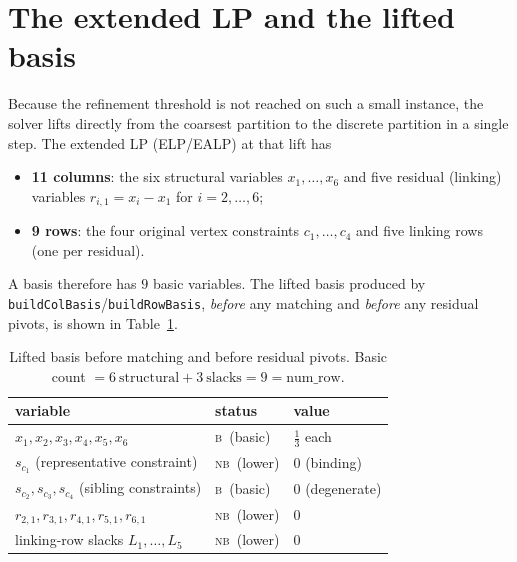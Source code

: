 \documentclass[11pt]{article}
\newcommand{\nb}{\textsc{nb}}
\newcommand{\bas}{\textsc{b}}
\newcommand{\slack}[1]{s_{#1}}
\begin{document}
\section{The extended LP and the lifted basis}

Because the refinement threshold is not reached on such a small instance, the
solver lifts directly from the coarsest partition to the discrete partition in a
single step. The extended LP (ELP/EALP) at that lift has
\begin{itemize}[nosep]
  \item \textbf{11 columns}: the six structural variables $x_1,\dots,x_6$ and
  five residual (linking) variables $r_{i,1}=x_i-x_1$ for $i=2,\dots,6$;
  \item \textbf{9 rows}: the four original vertex constraints $c_1,\dots,c_4$ and
  five linking rows (one per residual).
\end{itemize}
A basis therefore has $9$ basic variables. The lifted basis produced by
\texttt{buildColBasis}/\texttt{buildRowBasis}, \emph{before} any matching and
\emph{before} any residual pivots, is shown in Table~\ref{tab:lifted}.

\begin{table}[h]
\centering
\begin{tabular}{lll}
\toprule
variable & status & value\\
\midrule
$x_1,x_2,x_3,x_4,x_5,x_6$ & \bas\ (basic) & $\tfrac13$ each\\
$\slack{c_1}$ (representative constraint) & \nb\ (lower) & $0$ (binding)\\
$\slack{c_2},\slack{c_3},\slack{c_4}$ (sibling constraints) & \bas\ (basic) & $0$ (degenerate)\\
$r_{2,1},r_{3,1},r_{4,1},r_{5,1},r_{6,1}$ & \nb\ (lower) & $0$\\
linking-row slacks $L_1,\dots,L_5$ & \nb\ (lower) & $0$\\
\bottomrule
\end{tabular}
\caption{Lifted basis before matching and before residual pivots. Basic count
$=6\ \text{structural}+3\ \text{slacks}=9=\text{num\_row}$.}
\label{tab:lifted}
\end{table}
\end{document}
